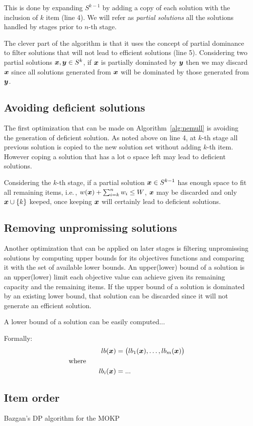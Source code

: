 This is done by expanding $S^{k-1}$ by adding a copy of each solution with the
inclusion of $k$ item (line 4).
We will refer as \emph{partial solutions} all the solutions handled by 
stages prior to $n$-th stage.

The clever part of the algorithm is that it uses the concept of partial dominance
to filter solutions that will not lead to efficient solutions (line 5).
Considering two partial solutions $\boldsymbol{x}, \boldsymbol{y} \in S^k$, if
$\boldsymbol{x}$ is partially dominated by $\boldsymbol{y}$ then we may discard $\boldsymbol{x}$ since all
solutions generated from $\boldsymbol{x}$ will be dominated by those generated from $\boldsymbol{y}$.

\subsection{Avoiding deficient solutions}

The first optimization that can be made on Algorithm~\ref{alg:nemull} is
avoiding the generation of deficient solution.
As noted above on line 4, at $k$-th stage all previous solution is copied to the
new solution set without adding $k$-th item.
However coping a solution that has a lot o space left may lead to deficient
solutions.

Considering the $k$-th stage, if a partial solution $\boldsymbol{x} \in S^{k-1}$ has enough
space to fit all remaining items, i.e.\,, $w(\boldsymbol{x}) + \sum_{i=k}^n w_i \leq W$,
$\boldsymbol{x}$ may be discarded and only $\boldsymbol{x} \cup \{k\}$ keeped, once
keeping $\boldsymbol{x}$ will certainly lead to deficient solutions.

\subsection{Removing unpromissing solutions}

Another optimization that can be applied on later stages is
filtering unpromissing solutions by computing upper bounds for its objectives
functions and comparing it with the set of available lower bounds.
An upper(lower) bound of a solution is an upper(lower) limit each objective
value can achieve given its remaining capacity and the remaining items.
If the upper bound of a solution is dominated by an existing lower bound,
that solution can be discarded since it will not generate an efficient solution.

A lower bound of a solution can be easily computed...

Formally:
\begin{displaymath}
\end{displaymath}
\begin{align*}
    lb(\boldsymbol{x}) &= \big(lb_1(\boldsymbol{x}),\ldots, lb_m(\boldsymbol{x}) \big) \\
    \text{where} \phantom{mmmmm} \\
    lb_i(\boldsymbol{x}) &= ...
\end{align*}

\subsection{Item order}

\begin{algorithm}
  \caption{Bazgan's DP algorithm for the MOKP}
  \label{alg:bazgan}
  
\end{algorithm}



